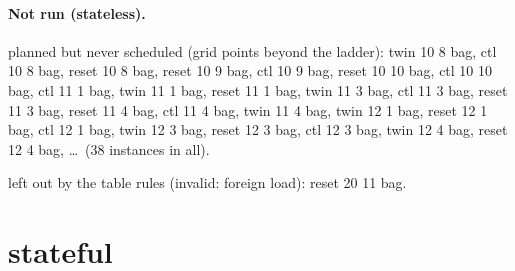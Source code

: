 \documentclass[10pt]{article}
\begin{document}
\paragraph{Not run (stateless).}
planned but never scheduled (grid points beyond the ladder): twin 10 8 bag, ctl 10 8 bag, reset 10 8 bag, reset 10 9 bag, ctl 10 9 bag, reset 10 10 bag, ctl 10 10 bag, ctl 11 1 bag, twin 11 1 bag, reset 11 1 bag, twin 11 3 bag, ctl 11 3 bag, reset 11 3 bag, reset 11 4 bag, ctl 11 4 bag, twin 11 4 bag, twin 12 1 bag, reset 12 1 bag, ctl 12 1 bag, twin 12 3 bag, reset 12 3 bag, ctl 12 3 bag, twin 12 4 bag, reset 12 4 bag, \ldots\ (38 instances in all).\par
left out by the table rules (invalid: foreign load): reset 20 11 bag.\par
\section*{stateful}
\end{document}
